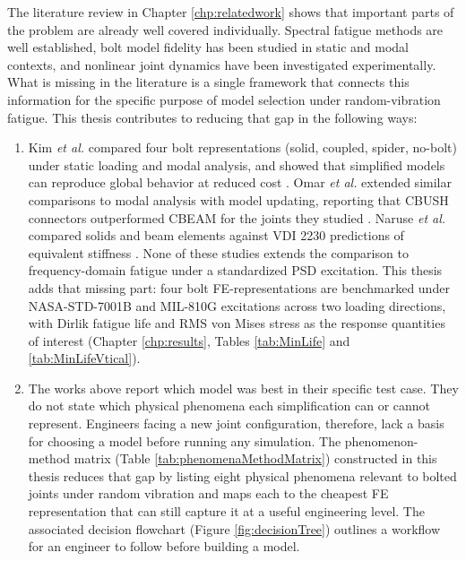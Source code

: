 \documentclass[a4paper,twoside]{bth}
\begin{document}
The literature review in Chapter \ref{chp:relatedwork} shows that important parts of the problem are already well covered individually. Spectral fatigue methods are well established, bolt model fidelity has been studied in static and modal contexts, and nonlinear joint dynamics have been investigated experimentally. What is missing in the literature is a single framework that connects this information for the specific purpose of model selection under random-vibration fatigue. This thesis contributes to reducing that gap in the following ways:
\newpage
\begin{enumerate}
    \item Kim \textit{et al.} compared four bolt representations (solid, coupled, spider, no-bolt) under static loading and modal analysis, and showed that simplified models can reproduce global behavior at reduced cost \cite{27}. Omar \textit{et al.} extended similar comparisons to modal analysis with model updating, reporting that CBUSH connectors outperformed CBEAM for the joints they studied \cite{noauthor_pdf_2025}. Naruse \textit{et al.} compared solids and beam elements against VDI 2230 predictions of equivalent stiffness \cite{09}. None of these studies extends the comparison to frequency-domain fatigue under a standardized \ac{PSD} excitation. This thesis adds that missing part: four bolt FE-representations are benchmarked under NASA-STD-7001B and MIL-810G excitations across two loading directions, with Dirlik fatigue life and \ac{RMS} von Mises stress as the response quantities of interest (Chapter \ref{chp:results}, Tables \ref{tab:MinLife} and \ref{tab:MinLifeVtical}).
    \item The works above report which model was best in their specific test case. They do not state which physical phenomena each simplification can or cannot represent. Engineers facing a new joint configuration, therefore, lack a basis for choosing a model before running any simulation. The phenomenon-method matrix (Table \ref{tab:phenomenaMethodMatrix}) constructed in this thesis reduces that gap by listing eight physical phenomena relevant to bolted joints under random vibration and maps each to the cheapest \ac{FE} representation that can still capture it at a useful engineering level. The associated decision flowchart (Figure \ref{fig:decisionTree}) outlines a workflow for an engineer to follow before building a model.

\end{enumerate}
\end{document}

